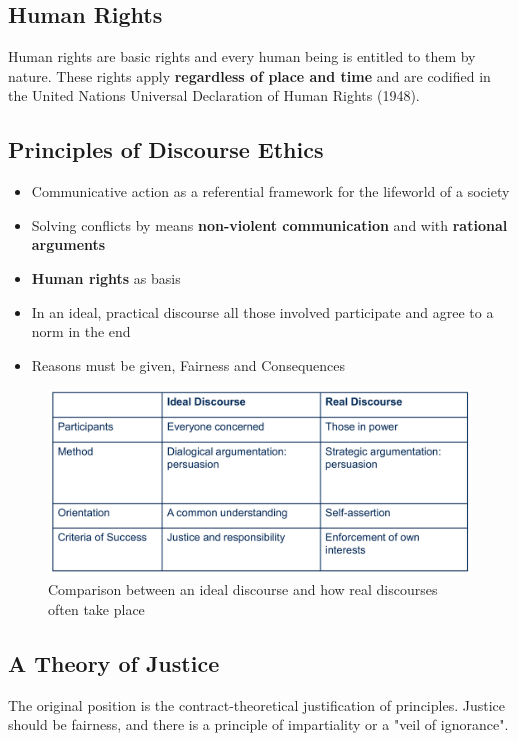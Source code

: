 \documentclass[11pt]{article}
\theoremstyle{definition}
\begin{document}
\subsection{Human Rights}
Human rights are basic rights and every human being is entitled to them by nature. These rights apply \textbf{regardless of place and time} and are codified in the United Nations Universal Declaration of Human Rights (1948).

\subsection{Principles of Discourse Ethics}
\begin{itemize}
	\item Communicative action as a referential framework for the lifeworld of a society
	\item Solving conflicts by means \textbf{non-violent communication} and with \textbf{rational arguments}
	\item \textbf{Human rights} as basis
	\item In an ideal, practical discourse all those involved participate and agree to a norm in the end
	\item Reasons must be given, Fairness and Consequences
\end{itemize}

\begin{figure}[tbh]
	\centering
	\includegraphics[width=0.8\linewidth]{img/discourse_comparison}
	\caption{Comparison between an ideal discourse and how real discourses often take place}
	\label{fig:discoursecomparison}
\end{figure}

\subsection{A Theory of Justice}
The original position is the contract-theoretical justification of principles. Justice should be fairness, and there is a principle of impartiality or a "veil of ignorance".
\end{document}
